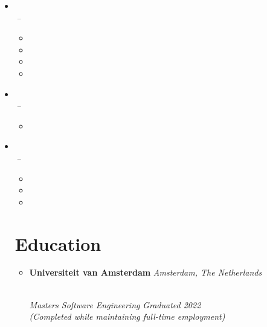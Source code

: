 \documentclass[11pt,a4paper]{article}
\begin{document}
\begin{itemize}[leftmargin=0pt,label={},itemsep=2em]
\item \parbox{\textwidth}{\textbf{\ACTName} \hfill \textit{\ACTLocation}}\\[2pt]
\textit{\ACTJobTitle} \hfill \textit{\ACTJobStart\,--\,\ACTJobEnd}\\[1pt]
\begin{itemize}[leftmargin=*,topsep=0pt,parsep=0pt,partopsep=0pt]
    \item \ACTFiscal
    \item \ACTSolutions
    \item \ACTSLA
    \item \ACTCustomers
\end{itemize}

\item \parbox{\textwidth}{\textbf{\HSBCName} \hfill \textit{\HSBCLocation}}\\[2pt]
\textit{\HSBCJobTitle} \hfill \textit{\HSBCJobStart\,--\,\HSBCJobEnd}\\[1pt]
\begin{itemize}[leftmargin=*,topsep=0pt,parsep=0pt,partopsep=0pt]
    \item \HSBCShort
\end{itemize}

\item \parbox{\textwidth}{\textbf{\LloydsName} \hfill \textit{\LloydsLocation}}\\[2pt]
\textit{\LloydsJobTitle} \hfill \textit{\LloydsJobStart\,--\,\LloydsJobEnd}\\[1pt]
\begin{itemize}[leftmargin=*,topsep=0pt,parsep=0pt,partopsep=0pt]
    \item \LloydsProjects
    \item \LloydsDeadlines
    \item \LloydsFiscal
\end{itemize}

\section{Education}
\begin{itemize}[leftmargin=0pt,label={},itemsep=2em]
\item \parbox{\textwidth}{\textbf{Universiteit van Amsterdam} \hfill \textit{Amsterdam, The Netherlands}}\\
\textit{Masters Software Engineering} \hfill \textit{Graduated 2022}\\
\textit{(Completed while maintaining full-time employment)}


\end{itemize}
\end{itemize}
\end{document}
